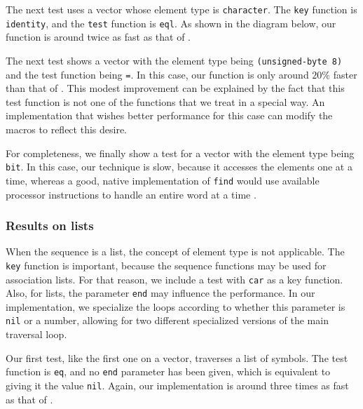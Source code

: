 
The next test uses a vector whose element type is
\texttt{character}.  The \texttt{key} function is \texttt{identity},
and the \texttt{test} function is \texttt{eql}.  As shown in the
diagram below, our function is around twice as fast as that of
\sbcl{}.


The next test shows a vector with the element type being
\texttt{(unsigned-byte 8)} and the test function being \texttt{=}.  In
this case, our function is only around $20\%$ faster than that of
\sbcl{}.  This modest improvement can be explained by the fact that
this test function is not one of the functions that we treat in a
special way.  An implementation that wishes better performance for
this case can modify the macros to reflect this desire.


For completeness, we finally show a test for a vector with the element
type being \texttt{bit}.  In this case, our technique is slow, because
it accesses the elements one at a time, whereas a good, native
implementation of \texttt{find} would use available processor
instructions to handle an entire word at a time
\cite{Baker:1990:EIB:121989.121991}.


\subsubsection{Results on lists}

When the sequence is a list, the concept of element type is not
applicable.  The \texttt{key} function is important, because the
sequence functions may be used for association lists.  For that
reason, we include a test with \texttt{car} as a key function.  Also,
for lists, the parameter \texttt{end} may influence the performance.
In our implementation, we specialize the loops according to whether
this parameter is \texttt{nil} or a number, allowing for two different
specialized versions of the main traversal loop.

Our first test, like the first one on a vector, traverses a list of
symbols.  The test function is \texttt{eq}, and no \texttt{end}
parameter has been given, which is equivalent to giving it the value
\texttt{nil}.  Again, our implementation is around three times as fast
as that of \sbcl{}.


